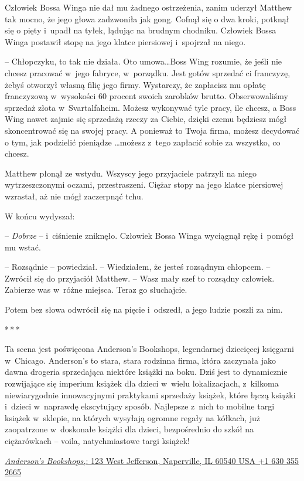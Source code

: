 \documentclass[oneside,polish,11pt,rmheadings]{mwbk}
\newcommand{\threeast}{\par\centerline{*\,*\,*}\medskip\par}
\begin{document}
Człowiek Bossa Winga nie dał mu żadnego ostrzeżenia, zanim uderzył Matthew tak mocno, że jego głowa zadzwoniła jak gong. Cofnął się o dwa kroki, potknął się o pięty i~upadł na tyłek, lądując na brudnym chodniku. Człowiek Bossa Winga postawił stopę na jego klatce piersiowej i~spojrzał na niego. 


-- Chłopczyku, to tak nie działa. Oto umowa\ldots  Boss Wing rozumie, że jeśli nie chcesz pracować w~jego fabryce, w~porządku. Jest gotów sprzedać ci franczyzę, żebyś otworzył własną filię jego firmy. Wystarczy, że zapłacisz mu opłatę franczyzową w~wysokości 60 procent swoich zarobków brutto. Obserwowaliśmy sprzedaż złota w~Svartalfaheim. Możesz wykonywać tyle pracy, ile chcesz, a Boss Wing nawet zajmie się sprzedażą rzeczy za Ciebie, dzięki czemu będziesz mógł skoncentrować się na swojej pracy. A ponieważ to Twoja firma, możesz decydować o tym, jak podzielić pieniądze \ldots  możesz z~tego zapłacić sobie za wszystko, co chcesz. 


Matthew płonął ze wstydu. Wszyscy jego przyjaciele patrzyli na niego wytrzeszczonymi oczami, przestraszeni. Ciężar stopy na jego klatce piersiowej wzrastał, aż nie mógł zaczerpnąć tchu. 


W końcu wydyszał: 

-- \textit{Dobrze }-- i~ciśnienie zniknęło. Człowiek Bossa Winga wyciągnął rękę i~pomógł mu wstać. 


-- Rozsądnie -- powiedział. -- Wiedziałem, że jesteś rozsądnym chłopcem. -- Zwrócił się do przyjaciół Matthew. -- Wasz mały szef to rozsądny człowiek. Zabierze was w~różne miejsca. Teraz go słuchajcie. 


Potem bez słowa odwrócił się na pięcie i~odszedł, a jego ludzie poszli za nim. 


\bigskip
\threeast


Ta scena jest poświęcona Anderson's Bookshops, legendarnej dziecięcej księgarni w~Chicago. Anderson's to stara, stara rodzinna firma, która zaczynała jako dawna drogeria sprzedająca niektóre książki na boku. Dziś jest to dynamicznie rozwijające się imperium książek dla dzieci w~wielu lokalizacjach, z~kilkoma niewiarygodnie innowacyjnymi praktykami sprzedaży książek, które łączą książki i~dzieci w~naprawdę ekscytujący sposób. Najlepsze z~nich to mobilne targi książek w~sklepie, na których wysyłają ogromne regały na kółkach, już zaopatrzone w~doskonałe książki dla dzieci, bezpośrednio do szkół na ciężarówkach -- voila, natychmiastowe targi książek! 


\href{https://en.wikipedia.org/wiki/HTTP_404}{\textit{Anderson's Bookshops,}: 123 West Jefferson, Naperville, IL 60540 USA +1 630 355 2665 }
\end{document}
